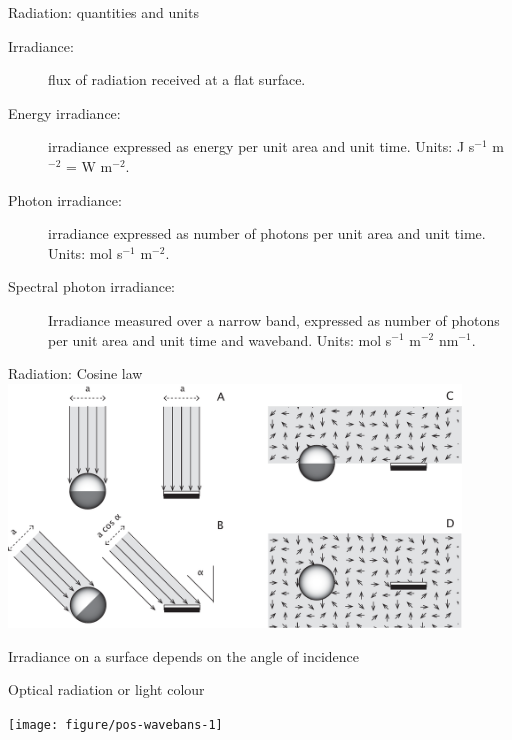 \documentclass[10pt]{beamer}\usepackage[]{graphicx}\usepackage[]{color}
\newenvironment{knitrout}{}{} %
\begin{document}
\begin{frame}{Radiation: quantities and units}
    \begin{description}
        \item[Irradiance:] flux of radiation received at a flat
        surface.
        \item[Energy irradiance:] irradiance expressed as energy per
        unit area and unit time. Units: J s$^{-1}$ m$^{-2}$ = W m$^{-2}$.
        \item[Photon irradiance:] irradiance expressed as number of
        photons per unit area and unit time. Units: mol s$^{-1}$ m$^{-2}$.
        \item[Spectral photon irradiance:] Irradiance measured over a
        narrow band, expressed as number of photons per unit area
        and unit time and waveband. Units: mol s$^{-1}$ m$^{-2}$ nm$^{-1}$.
    \end{description}
\end{frame}

\begin{frame}{Radiation: Cosine law}
    \centering
    \includegraphics[width=0.9\textwidth]{figures/cosine_arrows}

    {\small Irradiance on a surface depends on the angle of incidence
    \autocite[from][]{Aphalo2012}}
\end{frame}

\begin{frame}{Optical radiation or light colour}

\begin{knitrout}\tiny
{}\color{fgcolor}

{\centering \texttt{[image: figure/pos-wavebans-1]} 

}


\end{knitrout}
\end{frame}
\end{document}

